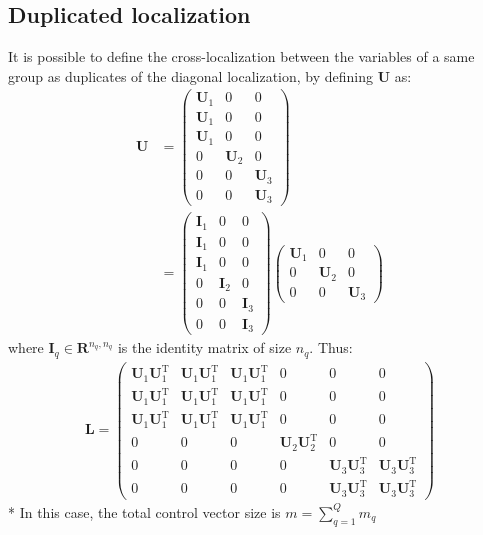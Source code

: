 \documentclass[12pt]{scrartcl}
\begin{document}
\subsection{Duplicated localization}
It is possible to define the cross-localization between the variables of a same group as duplicates of the diagonal localization, by defining $\mathbf{U}$ as: 
\begin{align}
\mathbf{U} & = \left( \begin{array}{c|c|c}
\mathbf{U}_1 & 0 & 0 \\
\mathbf{U}_1 & 0 & 0 \\
\mathbf{U}_1 & 0 & 0 \\[0.3ex]
\hline
0 & \mathbf{U}_2 & 0 \\[0.3ex]
\hline
0 & 0 & \mathbf{U}_3 \\
0 & 0 & \mathbf{U}_3
\end{array} \right) \nonumber \\
& = \left( \begin{array}{c|c|c}
\mathbf{I}_1 & 0 & 0 \\
\mathbf{I}_1 & 0 & 0 \\
\mathbf{I}_1 & 0 & 0 \\[0.3ex]
\hline
0 & \mathbf{I}_2 & 0 \\[0.3ex]
\hline
0 & 0 & \mathbf{I}_3 \\
0 & 0 & \mathbf{I}_3
\end{array} \right)
\left( \begin{array}{c|c|c}
\mathbf{U}_1 & 0 & 0 \\[0.3ex]
\hline
0 & \mathbf{U}_2 & 0 \\[0.3ex]
\hline
0 & 0 & \mathbf{U}_3
\end{array} \right)
\end{align}
where $\mathbf{I}_q \in \mathbf{R}^{n_q,n_q}$ is the identity matrix of size $n_q$. Thus:
\begin{align}
\mathbf{L} = \left( \begin{array}{ccc|c|cc}
\mathbf{U}_1 \mathbf{U}_1^\mathrm{T} & \mathbf{U}_1 \mathbf{U}_1^\mathrm{T} & \mathbf{U}_1 \mathbf{U}_1^\mathrm{T} & 0 & 0 & 0 \\
\mathbf{U}_1 \mathbf{U}_1^\mathrm{T} & \mathbf{U}_1 \mathbf{U}_1^\mathrm{T} & \mathbf{U}_1 \mathbf{U}_1^\mathrm{T} & 0 & 0 & 0 \\
\mathbf{U}_1 \mathbf{U}_1^\mathrm{T} & \mathbf{U}_1 \mathbf{U}_1^\mathrm{T} & \mathbf{U}_1 \mathbf{U}_1^\mathrm{T} & 0 & 0 & 0 \\[0.3ex]
\hline
0 & 0 & 0 & \mathbf{U}_2 \mathbf{U}_2^\mathrm{T} & 0 & 0 \\[0.3ex]
\hline
0 & 0 & 0 & 0 & \mathbf{U}_3 \mathbf{U}_3^\mathrm{T} & \mathbf{U}_3 \mathbf{U}_3^\mathrm{T} \\
0 & 0 & 0 & 0 & \mathbf{U}_3 \mathbf{U}_3^\mathrm{T} & \mathbf{U}_3 \mathbf{U}_3^\mathrm{T}
\end{array} \right)
\end{align}*
In this case, the total control vector size is $\displaystyle m = \sum_{q=1}^Q m_q$
\end{document}
